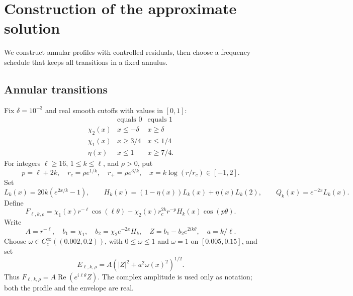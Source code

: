 \documentclass[11pt,twoside,leqno]{article}
\numberwithin{equation}{section}
\theoremstyle{definition}
\theoremstyle{remark}
\begin{document}
\section{Construction of the approximate solution}\label{sec:approximate}

We construct annular profiles with controlled residuals, then choose
a frequency schedule that keeps all transitions in a fixed annulus.

\subsection{Annular transitions}

Fix $\delta=10^{-3}$ and real smooth cutoffs with values in $[0,1]$:
\[
\begin{array}{c|cc}
 &\text{equals }0&\text{equals }1\\
 \chi_2(x)&x\le-\delta&x\ge\delta\\
 \chi_1(x)&x\ge3/4&x\le1/4\\
 \eta(x)&x\le1&x\ge7/4.
\end{array}
\]
For integers $\ell\ge16$, $1\le k\le\ell$, and $\rho>0$, put
\begin{equation}\label{eq:annular-parameters}
 p=\ell+2k,\quad r_c=\rho e^{1/k},\quad r_+=\rho e^{3/k},\quad
 x=k\log(r/r_c)\in[-1,2].
\end{equation}
Set
\[
 L_k(x)=20k(e^{2x/k}-1),\qquad
 H_k(x)=(1-\eta(x))L_k(x)+\eta(x)L_k(2),\qquad
 Q_k(x)=e^{-2x}L_k(x).
\]
Define
\begin{equation}\label{eq:profile}
 F_{\ell,k,\rho}
 =\chi_1(x)r^{-\ell}\cos(\ell\theta)
 -\chi_2(x)r_c^{2k}r^{-p}H_k(x)\cos(p\theta).
\end{equation}
Write
\[
 A=r^{-\ell},\quad b_1=\chi_1,\quad
 b_2=\chi_2e^{-2x}H_k,\quad Z=b_1-b_2e^{2ik\theta},\quad a=k/\ell.
\]
Choose $\omega\in C_c^\infty((0.002,0.2))$, with
$0\le\omega\le1$ and $\omega=1$ on $[0.005,0.15]$, and set
\begin{equation}\label{eq:envelope}
 E_{\ell,k,\rho}=A(|Z|^2+a^2\omega(x)^2)^{1/2}.
\end{equation}
Thus $F_{\ell,k,\rho}=A\operatorname{Re}(e^{i\ell\theta}Z)$.
The complex amplitude is used only as notation; both the profile and
the envelope are real.
\end{document}
